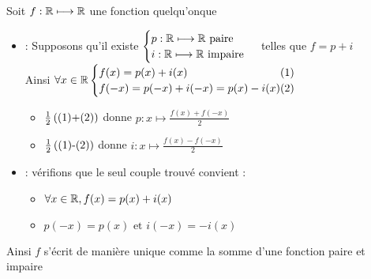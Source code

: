 \begin{corr}
	Soit \(f : \mathbb{R} \longmapsto \mathbb{R} \) une fonction quelqu'onque
	\begin{itemize}
		\item \analyse :  Supposons qu'il existe \(\begin{cases}
			      p:\mathbb{R} \longmapsto \mathbb{R} \text{ paire} \\
			      i:\mathbb{R} \longmapsto \mathbb{R} \text{ impaire}
		      \end{cases}\) telles que \(f = p + i\) \\
		      Ainsi \(\forall x \in \R \begin{cases}
			      f(x) = p(x) + i(x) \hfill (1)                  \\
			      f(-x) = p(-x) + i(-x) = p(x) - i(x) \hfill (2) \\
		      \end{cases}\) \\
		      \begin{itemize}
			      \item\(\frac{1}{2}\left(\text{(1)+(2)}\right)\) donne \(p:x\mapsto \frac{f(x)+f(-x)}{2}\) \\
			      \item \(\frac{1}{2}\left(\text{(1)-(2)}\right)\) donne \(i:x\mapsto \frac{f(x)-f(-x)}{2}\) \\
		      \end{itemize}
		\item \synthese : vérifions que le seul couple trouvé convient :
		      \begin{itemize}
			      \item \(\forall x \in \mathbb{R}, f(x) = p(x)+i(x)\)\\
			      \item \(p(-x) = p(x) \text{ et } i(-x) = -i(x)\)\\
		      \end{itemize}
	\end{itemize}
	Ainsi \(f\) s'écrit de manière unique comme la somme d'une fonction paire et impaire
\end{corr}

